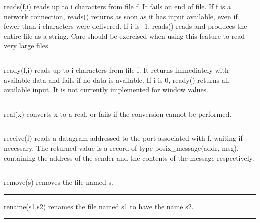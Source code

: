 \noindent
{}\textsf{reads(f,i)} reads up to \textsf{i} characters
from file \textsf{f}. It fails on end of file. If \textsf{f} is a
network connection, \textsf{reads()} returns as soon as it has input
available, even if fewer than \textsf{i} characters were delivered. If
\textsf{i} is -1, \textsf{reads()} reads and produces the entire file
as a string. Care should be exercised when using this feature to read
very large files.

\bigskip\hrule\vspace{0.1cm}

\noindent
{}\textsf{ready(f,i)} reads up to \textsf{i} characters
from file \textsf{f}. It returns immediately with available data and
fails if no data is available. If \textsf{i} is 0, \textsf{ready()}
returns all available input. It is not currently implemented for window
values.

\bigskip\hrule\vspace{0.1cm}

\noindent
{}\textsf{real(x)} converts \textsf{x} to a real,
or fails if the conversion cannot be performed.

\bigskip\hrule\vspace{0.1cm}

\noindent
{}\textsf{receive(f)} reads a datagram addressed
to the port associated with \textsf{f}, waiting if necessary. The
returned value is a record of type \textsf{posix\_message(addr, msg)},
containing the address of the sender and the contents of the message
respectively. 

\bigskip\hrule\vspace{0.1cm}

\noindent
{}\textsf{remove(s)} removes the
file named \textsf{s}.

\bigskip\hrule\vspace{0.1cm}

\noindent
{}\textsf{rename(s1,s2)} renames the file named
\textsf{s1} to have the name \textsf{s2}.

\bigskip\hrule\vspace{0.1cm}

